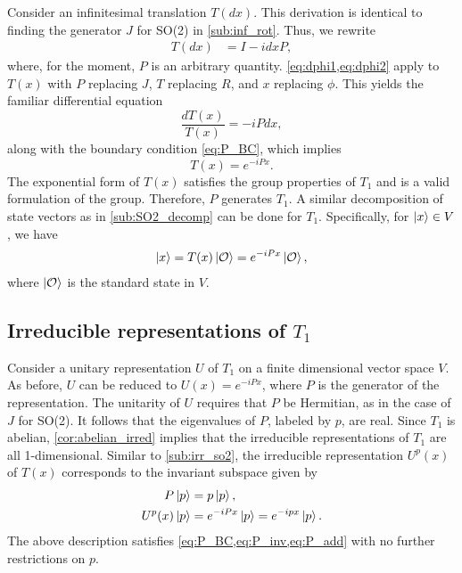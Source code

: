 Consider an infinitesimal translation $T(dx)$. This derivation is identical to finding the generator $J$ for SO(2) in \cref{sub:inf_rot}. Thus, we rewrite
\begin{align}
    T(dx) &= I - i dx P,
\end{align}
where, for the moment, $P$ is an arbitrary quantity. \cref{eq:dphi1,eq:dphi2} apply to $T(x)$ with $P$ replacing $J$, $T$ replacing $R$, and $x$ replacing $\phi$. This yields the familiar differential equation
\begin{equation}
    \frac{dT(x)}{T(x)} = -iP dx,
\end{equation}
along with the boundary condition \cref{eq:P_BC}, which implies
\begin{equation}
    T(x) = e^{-iPx}.
\end{equation}
The exponential form of $T(x)$ satisfies the group properties of $T_1$ and is a valid formulation of the group. Therefore, $P$ generates $T_1$. A similar decomposition of state vectors as in \cref{sub:SO2_decomp} can be done for $T_1$. Specifically, for $\ket{x}\in V$, we have
\begin{align}
    \ket{x} = T(x)\ket{\mathcal{O}} = e^{-iPx}\ket{\mathcal{O}},
\end{align}
where $\ket{\mathcal{O}}$ is the standard state in $V$.

\subsection{Irreducible representations of $T_1$}
Consider a unitary representation $U$ of $T_1$ on a finite dimensional vector space $V$. As before, $U$ can be reduced to $U(x) = e^{-iPx}$, where $P$ is the generator of the representation. The unitarity of $U$ requires that $P$ be Hermitian, as in the case of $J$ for SO(2). It follows that the eigenvalues of $P$, labeled by $p$, are real. Since $T_1$ is abelian, \cref{cor:abelian_irred} implies that the irreducible representations of $T_1$ are all 1-dimensional. Similar to \cref{sub:irr_so2}, the irreducible representation $U^p(x)$ of $T(x)$ corresponds to the invariant subspace given by
\begin{align}
    P\ket{p} &= p\ket{p}, \\
    U^p(x)\ket{p} &= e^{-iPx}\ket{p} = e^{-ip x}\ket{p}.
\end{align}
The above description satisfies \cref{eq:P_BC,eq:P_inv,eq:P_add} with no further restrictions on $p$. 

